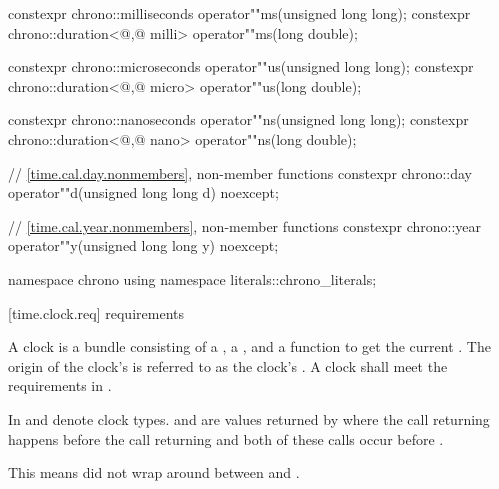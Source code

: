 \begin{codeblock}
{{{    constexpr chrono::milliseconds                 operator""ms(unsigned long long);
    constexpr chrono::duration<@\unspec,@ milli> operator""ms(long double);

    constexpr chrono::microseconds                 operator""us(unsigned long long);
    constexpr chrono::duration<@\unspec,@ micro> operator""us(long double);

    constexpr chrono::nanoseconds                 operator""ns(unsigned long long);
    constexpr chrono::duration<@\unspec,@ nano> operator""ns(long double);

    // \ref{time.cal.day.nonmembers}, non-member functions
    constexpr chrono::day  operator""d(unsigned long long d) noexcept;

    // \ref{time.cal.year.nonmembers}, non-member functions
    constexpr chrono::year operator""y(unsigned long long y) noexcept;
  }
  }

  namespace chrono {
    using namespace literals::chrono_literals;
  }
}
\end{codeblock}

[time.clock.req]{ requirements}

\pnum
A clock is a bundle consisting of a , a
, and a function  to get the current .
The origin of the clock's  is referred to as the clock's .
 A clock shall meet the requirements in .

\pnum
In   and  denote clock types.  and
 are values returned by  where the call returning  happens
before the call returning  and both of these calls
occur
before .
\begin{note}
This means  did not wrap around between  and
.
\end{note}

